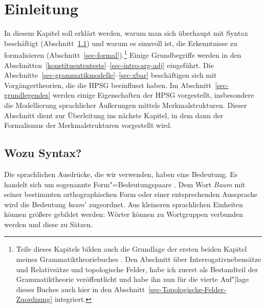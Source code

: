 

\chapter{Einleitung}

In diesem Kapitel soll erklärt werden, warum man sich überhaupt mit Syntax
beschäftigt (Abschnitt~\ref{sec-wozu-syntax}) und 
warum es sinnvoll ist, die Erkenntnisse zu formalisieren (Abschnitt~\ref{sec-formal}).\footnote{
  Teile dieses Kapitels bilden auch die Grundlage der ersten beiden Kapitel meines Grammatiktheoriebuches
  \citep{MuellerGTBuch2}. Den Abschnitt über Interrogativnebensätze und Relativsätze und
  topologische Felder, habe ich zuerst als Bestandteil der Grammatiktheorie veröffentlicht und habe ihn nun für die
  vierte Auf"|lage dieses Buches auch hier in den Abschnitt~\ref{sec-Topologische-Felder-Zuordnung} integriert.
}
Einige Grundbegriffe werden in den Abschnitten~\ref{konstituententests}--\ref{sec-intro-arg-adj} eingeführt. 
Die Abschnitte~\ref{sec-grammatikmodelle}--\ref{sec-xbar}
beschäftigen sich mit Vorgängertheorien, die die HPSG beeinflusst haben.
Im Abschnitt~\ref{sec-grundlegendes} werden einige Eigenschaften der HPSG
vorgestellt, insbesondere die Modellierung sprachlicher Äußerungen mittels
Merkmalstrukturen. Dieser Abschnitt dient zur Überleitung ins nächste Kapitel,
in dem dann der Formalismus der Merkmalstrukturen vorgestellt wird.

\section{Wozu Syntax?}
\label{sec-wozu-syntax}

Die sprachlichen Ausdrücke, die wir verwenden, haben eine Bedeutung. Es handelt
sich um sogenannte Form"=Bedeutungspaare \citep{Saussure16a-de}. Dem Wort \emph{Baum}
mit seiner bestimmten orthographischen Form oder einer entsprechenden Aussprache
wird die Bedeutung \emph{baum}$'$ zugeordnet. Aus kleineren sprachlichen Einheiten
können größere gebildet werden: Wörter können zu Wortgruppen verbunden werden
und diese zu Sätzen.

